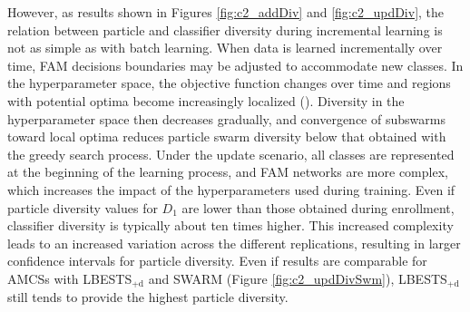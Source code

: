 \begin{figure*}[t]
  \centering
	\caption{Particle and classifier diversity of the AMCS's ensemble versus the number of learning block during the update learning scenario (Figures \ref{fig:c2_updDivSwm} and \ref{fig:c2_updDivFam}).
The ambiguity indicator (Equation \ref{eq:c2_divFam}) was used for classifier diversity and all results are presented with their 90\% confidence interval.
Also shown is the classifier diversity as a function of the particle diversity using all data points (Figure \ref{fig:c2_updDivCor})}
	\label{fig:c2_updDiv}
\end{figure*}

However, as results shown in Figures \ref{fig:c2_addDiv} and \ref{fig:c2_updDiv}, the relation between particle and classifier diversity during incremental learning is not as simple as with batch learning.
When data is learned incrementally over time, FAM decisions boundaries may be adjusted to accommodate new classes.
In the hyperparameter space, the objective function changes over time and regions with potential optima become increasingly localized (\cite{connolly10}).
Diversity in the hyperparameter space then decreases gradually, and convergence of subswarms toward local optima reduces particle swarm diversity below that obtained with the greedy search process. 
Under the update scenario, all classes are represented at the beginning of the learning process, and FAM networks are more complex, which increases the impact of the hyperparameters used during training.
Even if particle diversity values for $D_1$ are lower than those obtained during enrollment, classifier diversity is typically about ten times higher.
This increased complexity leads to an increased variation across the different replications, resulting in larger confidence intervals for particle diversity.
Even if results are comparable for AMCSs with LBESTS$_\text{+d}$ and SWARM (Figure \ref{fig:c2_updDivSwm}), LBESTS$_\text{+d}$ still tends to provide the highest particle diversity.

